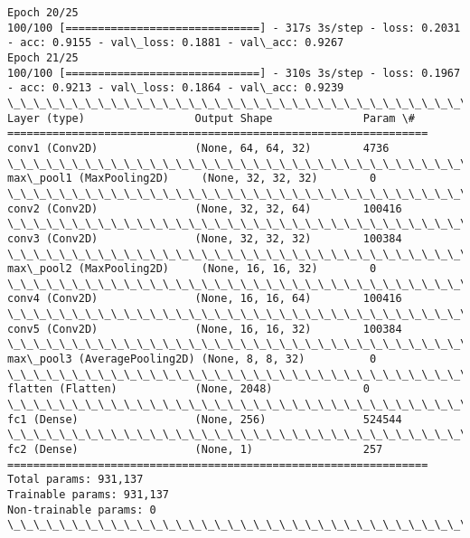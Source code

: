 \documentclass[11pt]{article}
\begin{document}
\begin{Verbatim}[commandchars=\\\{\}]
Epoch 20/25
100/100 [==============================] - 317s 3s/step - loss: 0.2031 - acc: 0.9155 - val\_loss: 0.1881 - val\_acc: 0.9267
Epoch 21/25
100/100 [==============================] - 310s 3s/step - loss: 0.1967 - acc: 0.9213 - val\_loss: 0.1864 - val\_acc: 0.9239
\_\_\_\_\_\_\_\_\_\_\_\_\_\_\_\_\_\_\_\_\_\_\_\_\_\_\_\_\_\_\_\_\_\_\_\_\_\_\_\_\_\_\_\_\_\_\_\_\_\_\_\_\_\_\_\_\_\_\_\_\_\_\_\_\_
Layer (type)                 Output Shape              Param \#   
=================================================================
conv1 (Conv2D)               (None, 64, 64, 32)        4736      
\_\_\_\_\_\_\_\_\_\_\_\_\_\_\_\_\_\_\_\_\_\_\_\_\_\_\_\_\_\_\_\_\_\_\_\_\_\_\_\_\_\_\_\_\_\_\_\_\_\_\_\_\_\_\_\_\_\_\_\_\_\_\_\_\_
max\_pool1 (MaxPooling2D)     (None, 32, 32, 32)        0         
\_\_\_\_\_\_\_\_\_\_\_\_\_\_\_\_\_\_\_\_\_\_\_\_\_\_\_\_\_\_\_\_\_\_\_\_\_\_\_\_\_\_\_\_\_\_\_\_\_\_\_\_\_\_\_\_\_\_\_\_\_\_\_\_\_
conv2 (Conv2D)               (None, 32, 32, 64)        100416    
\_\_\_\_\_\_\_\_\_\_\_\_\_\_\_\_\_\_\_\_\_\_\_\_\_\_\_\_\_\_\_\_\_\_\_\_\_\_\_\_\_\_\_\_\_\_\_\_\_\_\_\_\_\_\_\_\_\_\_\_\_\_\_\_\_
conv3 (Conv2D)               (None, 32, 32, 32)        100384    
\_\_\_\_\_\_\_\_\_\_\_\_\_\_\_\_\_\_\_\_\_\_\_\_\_\_\_\_\_\_\_\_\_\_\_\_\_\_\_\_\_\_\_\_\_\_\_\_\_\_\_\_\_\_\_\_\_\_\_\_\_\_\_\_\_
max\_pool2 (MaxPooling2D)     (None, 16, 16, 32)        0         
\_\_\_\_\_\_\_\_\_\_\_\_\_\_\_\_\_\_\_\_\_\_\_\_\_\_\_\_\_\_\_\_\_\_\_\_\_\_\_\_\_\_\_\_\_\_\_\_\_\_\_\_\_\_\_\_\_\_\_\_\_\_\_\_\_
conv4 (Conv2D)               (None, 16, 16, 64)        100416    
\_\_\_\_\_\_\_\_\_\_\_\_\_\_\_\_\_\_\_\_\_\_\_\_\_\_\_\_\_\_\_\_\_\_\_\_\_\_\_\_\_\_\_\_\_\_\_\_\_\_\_\_\_\_\_\_\_\_\_\_\_\_\_\_\_
conv5 (Conv2D)               (None, 16, 16, 32)        100384    
\_\_\_\_\_\_\_\_\_\_\_\_\_\_\_\_\_\_\_\_\_\_\_\_\_\_\_\_\_\_\_\_\_\_\_\_\_\_\_\_\_\_\_\_\_\_\_\_\_\_\_\_\_\_\_\_\_\_\_\_\_\_\_\_\_
max\_pool3 (AveragePooling2D) (None, 8, 8, 32)          0         
\_\_\_\_\_\_\_\_\_\_\_\_\_\_\_\_\_\_\_\_\_\_\_\_\_\_\_\_\_\_\_\_\_\_\_\_\_\_\_\_\_\_\_\_\_\_\_\_\_\_\_\_\_\_\_\_\_\_\_\_\_\_\_\_\_
flatten (Flatten)            (None, 2048)              0         
\_\_\_\_\_\_\_\_\_\_\_\_\_\_\_\_\_\_\_\_\_\_\_\_\_\_\_\_\_\_\_\_\_\_\_\_\_\_\_\_\_\_\_\_\_\_\_\_\_\_\_\_\_\_\_\_\_\_\_\_\_\_\_\_\_
fc1 (Dense)                  (None, 256)               524544    
\_\_\_\_\_\_\_\_\_\_\_\_\_\_\_\_\_\_\_\_\_\_\_\_\_\_\_\_\_\_\_\_\_\_\_\_\_\_\_\_\_\_\_\_\_\_\_\_\_\_\_\_\_\_\_\_\_\_\_\_\_\_\_\_\_
fc2 (Dense)                  (None, 1)                 257       
=================================================================
Total params: 931,137
Trainable params: 931,137
Non-trainable params: 0
\_\_\_\_\_\_\_\_\_\_\_\_\_\_\_\_\_\_\_\_\_\_\_\_\_\_\_\_\_\_\_\_\_\_\_\_\_\_\_\_\_\_\_\_\_\_\_\_\_\_\_\_\_\_\_\_\_\_\_\_\_\_\_\_\_

    \end{Verbatim}
\end{document}
